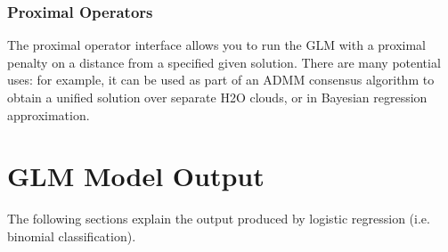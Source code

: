 \subsubsection{Proximal Operators}

The proximal operator interface allows you to run the GLM with a proximal penalty on a distance from a specified
given solution. There are many potential uses: for example, it can be used as part of an ADMM consensus algorithm
to obtain a unified solution over separate H2O clouds, or in Bayesian regression approximation.


\section{GLM Model Output}

The following sections explain the output produced by logistic regression (i.e. binomial classification).

\bigskip
\waterExampleInR


